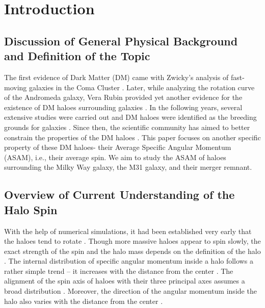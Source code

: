 \documentclass[twocolumn]{aastex631}
\begin{document}
\section{Introduction} \label{sec:intro}

\subsection{Discussion of General Physical Background and Definition of the Topic}

The first evidence of Dark Matter (DM) came with Zwicky's analysis of fast-moving galaxies in the Coma Cluster \citep{1933AcHPh...6..110Z}. Later, while analyzing the rotation curve of the Andromeda galaxy, Vera Rubin provided yet another evidence for the existence of DM haloes surrounding galaxies \citep{1970ApJ...159..379R}. In the following years, several extensive studies were carried out and DM haloes were identified as the breeding grounds for galaxies \citep[see e.g.,][]{1978MNRAS.183..341W}. Since then, the scientific community has aimed to better constrain the properties of the DM haloes \citep[see e.g.,][analyze the triaxial shape of DM haloes]{1985ApJ...292..371D}. This paper focuses on another specific property of these DM haloes- their Average Specific Angular Momentum (ASAM), i.e., their average spin. We aim to study the ASAM of haloes surrounding the Milky Way galaxy, the M31 galaxy, and their merger remnant. 

\subsection{Overview of Current Understanding of the Halo Spin}

With the help of numerical simulations, it had been established very early that the haloes tend to rotate \citep{1987ApJ...319..575B}. Though more massive haloes appear to spin slowly, the exact strength of the spin and the halo mass depends on the definition of the halo \citep{2007MNRAS.376..215B}. The internal distribution of specific angular momentum inside a halo follows a rather simple trend -- it increases with the distance from the center \citep{2012AnP...524..507F}. The alignment of the spin axis of haloes with their three principal axes assumes a broad distribution \citep[see e.g., ][]{2006ApJ...646..815S, 2007MNRAS.376..215B}. Moreover, the direction of the angular momentum inside the halo also varies with the distance from the center \citep{2010MNRAS.404.1137B}. 
\end{document}

